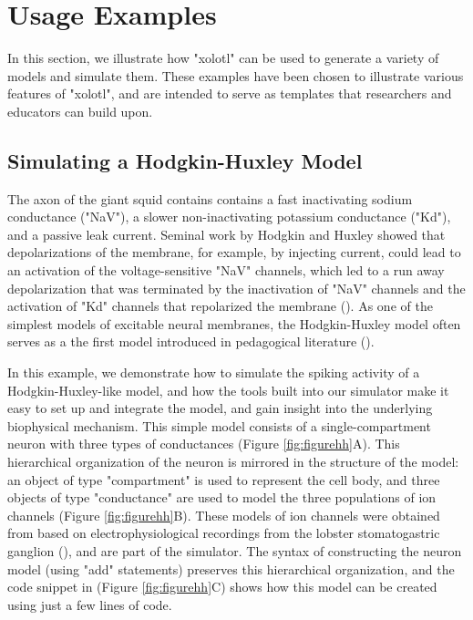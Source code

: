 \documentclass{frontiersSCNS} %
\begin{document}
%
%
%
%
%
%

\section{Usage Examples}
\label{usage}

In this section, we illustrate how "xolotl" can be used to generate a variety of models and simulate them. These examples have been chosen to illustrate various features of "xolotl", and are intended to serve as templates that researchers and educators can build upon.

%
%
%
%
%
%

\subsection{Simulating a Hodgkin-Huxley Model}

The axon of the giant squid contains contains a fast inactivating sodium conductance ("NaV"), a slower non-inactivating potassium conductance ("Kd"), and a passive leak current. Seminal work by Hodgkin and Huxley showed that depolarizations of the membrane, for example, by injecting current, could lead to an activation of the voltage-sensitive "NaV" channels, which led to a run away depolarization that was terminated by the inactivation of "NaV" channels and the activation of "Kd" channels that repolarized the membrane (\cite{hodgkinComponentsMembraneConductance1952, hodgkinMeasurementCurrentvoltageRelations1952a}). As one of the simplest models of excitable neural membranes, the Hodgkin-Huxley model often serves as a the first model introduced in pedagogical literature (\cite{dayanTheoreticalNeuroscience2001, sterrattPrinciplesComputationalModelling2011, trappenbergFundamentalsComputationalNeuroscience2010}).  


In this example, we demonstrate how to simulate the spiking activity of a Hodgkin-Huxley-like model, and how the tools built into our simulator make it easy to set up and integrate the model, and gain insight into the underlying biophysical mechanism. This simple model consists of a single-compartment neuron with three types of conductances  (Figure \ref{fig:figurehh}A). This hierarchical organization of the neuron is mirrored in the structure of the model: an object of type "compartment" is used to represent the cell body, and three objects of type "conductance" are used to model the three populations of ion channels (Figure \ref{fig:figurehh}B). These models of ion channels were obtained from \cite{liuModelNeuronActivityDependent1998} based on electrophysiological recordings from the lobster stomatogastric ganglion (\cite{turrigianoSelectiveRegulationCurrent1995}), and are part of the simulator. The syntax of constructing the neuron model (using "add" statements) preserves this hierarchical organization, and the code snippet in (Figure \ref{fig:figurehh}C) shows how this model can be created using just a few lines of code. 
\end{document}
